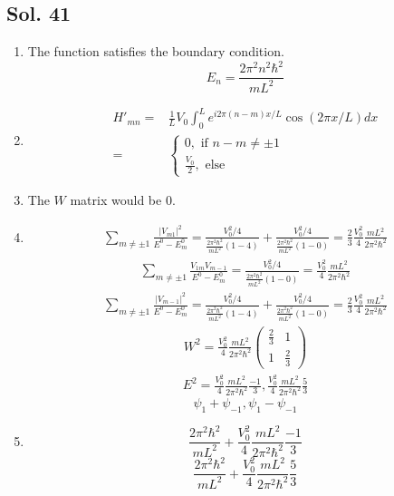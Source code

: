 \subsection*{Sol. 41}
\begin{enumerate}
    \item The function satisfies the boundary condition.
    $$
    E_n = \frac{2\pi^2n^2\hbar^2}{mL^2}
    $$
    \item 
    \begin{align*}
        H'_{mn} =& 
        \frac{1}{L}V_0\int_0^L
        e^{i2\pi (n-m)x/L}
        \cos(2\pi x/L)dx\\
        =&\begin{cases}
        0,\text{ if } n-m\neq \pm 1\\
        \frac{V_0}{2}, \text{ else }
        \end{cases}
    \end{align*}
    \item 
    The $W$ matrix would be 0.
    \item 
    \begin{align*}
        \sum_{m\neq \pm1}
        \frac{|V_{m1}|^2}{E^0 - E^0_m} = 
        \frac{V_0^2/4}{\frac{2\pi^2\hbar^2}{mL^2}(1-4)}+
        \frac{V_0^2/4}{\frac{2\pi^2\hbar^2}{mL^2}(1-0)}= 
       \frac{2}{3}\frac{V_0^2}{4}\frac{mL^2}{2\pi^2\hbar^2}
    \end{align*}
    \begin{align*}
        \sum_{m\neq \pm1}
        \frac{V_{1m}V_{m-1}}{E^0 - E^0_m} =
        \frac{V_0^2/4}{\frac{2\pi^2\hbar^2}{mL^2}(1-0)} = \frac{V_0^2}{4}\frac{mL^2}{2\pi^2\hbar^2}
    \end{align*}
    \begin{align*}
        \sum_{m\neq \pm1}
        \frac{|V_{m-1}|^2}{E^0 - E^0_m}
        =\frac{V_0^2/4}{\frac{2\pi^2\hbar^2}{mL^2}(1-4)}+
        \frac{V_0^2/4}{\frac{2\pi^2\hbar^2}{mL^2}(1-0)}=\frac{2}{3}\frac{V_0^2}{4}\frac{mL^2}{2\pi^2\hbar^2}
    \end{align*}
    \begin{align*}
        W^2 = \frac{V_0^2}{4}\frac{mL^2}{2\pi^2\hbar^2}\begin{pmatrix}
           \frac{2}{3} & 1 \\
            1 & \frac{2}{3}
        \end{pmatrix}
    \end{align*}
    \begin{align*}
        E^2 = \frac{V_0^2}{4}\frac{mL^2}{2\pi^2\hbar^2}\frac{-1}{3}, 
        \frac{V_0^2}{4}\frac{mL^2}{2\pi^2\hbar^2}\frac{5}{3}
    \end{align*}
    $$
    \psi_1 + \psi_{-1}, 
    \psi_1 - \psi_{-1}
    $$
    \item 
    $$
     \frac{2\pi^2\hbar^2}{mL^2}+
     \frac{V_0^2}{4}\frac{mL^2}{2\pi^2\hbar^2}\frac{-1}{3}
    $$
    $$
    \frac{2\pi^2\hbar^2}{mL^2}+
     \frac{V_0^2}{4}\frac{mL^2}{2\pi^2\hbar^2}\frac{5}{3}
    $$
\end{enumerate}

